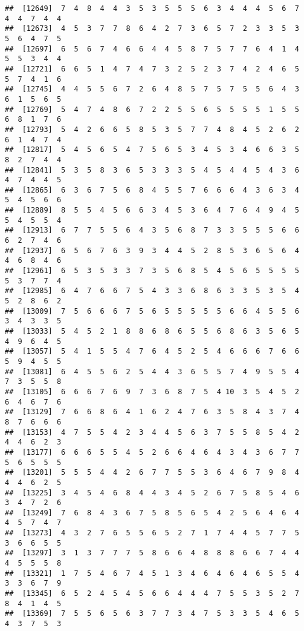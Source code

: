 \documentclass[
]{book}
\begin{document}
\begin{verbatim}
##  [12649]  7  4  8  4  4  3  5  3  5  5  5  6  3  4  4  4  5  6  7  4  4  7  4  4
##  [12673]  4  5  3  7  7  8  6  4  2  7  3  6  5  7  2  3  3  5  3  5  6  4  7  5
##  [12697]  6  5  6  7  4  6  6  4  4  5  8  7  5  7  7  6  4  1  4  5  5  3  4  4
##  [12721]  6  6  5  1  4  7  4  7  3  2  5  2  3  7  4  2  4  6  5  5  7  4  1  6
##  [12745]  4  4  5  5  6  7  2  6  4  8  5  7  5  7  5  5  6  4  3  6  1  5  6  5
##  [12769]  5  4  7  4  8  6  7  2  2  5  5  6  5  5  5  5  1  5  5  6  8  1  7  6
##  [12793]  5  4  2  6  6  5  8  5  3  5  7  7  4  8  4  5  2  6  2  6  1  4  7  4
##  [12817]  5  4  5  6  5  4  7  5  6  5  3  4  5  3  4  6  6  3  5  8  2  7  4  4
##  [12841]  5  3  5  8  3  6  5  3  3  3  5  4  5  4  4  5  4  3  6  4  7  4  4  5
##  [12865]  6  3  6  7  5  6  8  4  5  5  7  6  6  6  4  3  6  3  4  5  4  5  6  6
##  [12889]  8  5  5  4  5  6  6  3  4  5  3  6  4  7  6  4  9  4  5  5  4  5  5  4
##  [12913]  6  7  7  5  5  6  4  3  5  6  8  7  3  3  5  5  5  6  6  6  2  7  4  6
##  [12937]  6  5  6  7  6  3  9  3  4  4  5  2  8  5  3  6  5  6  4  4  6  8  4  6
##  [12961]  6  5  3  5  3  3  7  3  5  6  8  5  4  5  6  5  5  5  5  5  3  7  7  4
##  [12985]  6  4  7  6  6  7  5  4  3  3  6  8  6  3  3  5  3  5  4  5  2  8  6  2
##  [13009]  7  5  6  6  6  7  5  6  5  5  5  5  5  6  6  4  5  5  6  3  4  3  3  5
##  [13033]  5  4  5  2  1  8  8  6  8  6  5  5  6  8  6  3  5  6  5  4  9  6  4  5
##  [13057]  5  4  1  5  5  4  7  6  4  5  2  5  4  6  6  6  7  6  6  5  9  4  5  5
##  [13081]  6  4  5  5  6  2  5  4  4  3  6  5  5  7  4  9  5  5  4  7  3  5  5  8
##  [13105]  6  6  6  7  6  9  7  3  6  8  7  5  4 10  3  5  4  5  2  6  4  6  7  6
##  [13129]  7  6  6  8  6  4  1  6  2  4  7  6  3  5  8  4  3  7  4  8  7  6  6  6
##  [13153]  4  7  5  5  4  2  3  4  4  5  6  3  7  5  5  8  5  4  2  4  4  6  2  3
##  [13177]  6  6  6  5  5  4  5  2  6  6  4  6  4  3  4  3  6  7  7  5  6  5  5  5
##  [13201]  5  5  5  4  4  2  6  7  7  5  5  3  6  4  6  7  9  8  4  4  4  6  2  5
##  [13225]  3  4  5  4  6  8  4  4  3  4  5  2  6  7  5  8  5  4  6  3  4  7  2  6
##  [13249]  7  6  8  4  3  6  7  5  8  5  6  5  4  2  5  6  4  6  4  4  5  7  4  7
##  [13273]  4  3  2  7  6  5  5  6  5  2  7  1  7  4  4  5  7  7  5  3  6  6  5  5
##  [13297]  3  1  3  7  7  7  5  8  6  6  4  8  8  8  6  6  7  4  4  4  5  5  5  8
##  [13321]  1  7  5  4  6  7  4  5  1  3  4  6  4  6  4  6  5  5  4  3  3  6  7  9
##  [13345]  6  5  2  4  5  4  5  6  6  4  4  4  7  5  5  3  5  2  7  8  4  1  4  5
##  [13369]  7  5  5  6  5  6  3  7  7  3  4  7  5  3  3  5  4  6  5  4  3  7  5  3

\end{verbatim}
\end{document}
